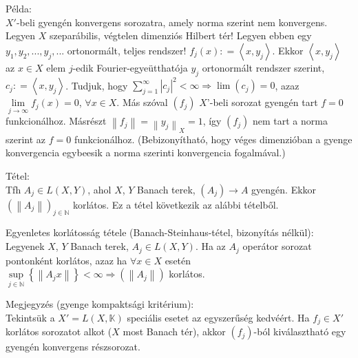 \documentclass[12pt,a4paper]{scrartcl}
\newenvironment{tetel}{}{}
\newenvironment{megjegyzes}{}{}
\newenvironment{pelda}{}{}
\begin{document}
\begin{pelda}

Példa:\\
\(X'\)-beli gyengén konvergens sorozatra, amely norma szerint nem
konvergens. Legyen \(X\) szeparábilis, végtelen dimenziós Hilbert tér!
Legyen ebben egy \(y_{1},y_{2},...,y_{j},...\) ortonormált, teljes
rendszer!
\(f_{j}\left( x \right): = \left\langle {x,y_{j}} \right\rangle\). Ekkor
\(\left\langle {x,y_{j}} \right\rangle\) az \(x \in X\) elem \(j\)-edik
Fourier-egyeütthatója \(y_{j}\) ortonormált rendszer szerint,
\(c_{j}: = \left\langle {x,y_{j}} \right\rangle\). Tudjuk, hogy
\(\left. {\sum\limits_{j = 1}^{\infty}\left| c_{j} \right|^{2}} < \infty\Rightarrow\lim\left( c_{j} \right) = 0 \right.\),
azaz \(\lim\limits_{j\rightarrow\infty}f_{j}\left( x \right) = 0\),
\(\forall x \in X\). Más szóval \(\left( f_{j} \right)\) \(X\)'-beli
sorozat gyengén tart \(f = 0\) funkcionálhoz. Másrészt
\(\left\| f_{j} \right\| = \left\| y_{j} \right\|_{X} = 1\), így
\(\left( f_{j} \right)\) nem tart a norma szerint az \(f = 0\)
funkcionálhoz. (Bebizonyítható, hogy véges dimenzióban a gyenge
konvergencia egybeesik a norma szerinti konvergencia fogalmával.)

\end{pelda}

\begin{tetel}

Tétel:\\
Tfh \(A_{j} \in L\left( {X,Y} \right)\), ahol \(X\), \(Y\) Banach terek,
\(\left. \left( A_{j} \right)\rightarrow A \right.\) gyengén. Ekkor
\(\left( \left\| A_{j} \right\| \right)_{j \in {\mathbb{N}}}\) korlátos.
Ez a tétel következik az alábbi tételből.

\end{tetel}

\begin{tetel}

Egyenletes korlátosság tétele (Banach-Steinhaus-tétel, bizonyítás
nélkül):\\
Legyenek \(X\), \(Y\) Banach terek, \(A_{j} \in L\left( {X,Y} \right)\).
Ha az \(A_{j}\) operátor sorozat pontonként korlátos, azaz ha
\(\forall x \in X\) esetén
\(\left. \sup\limits_{j \in {\mathbb{N}}}\left\{ \left\| {A_{j}x} \right\| \right\} < \infty\Rightarrow\left( \left\| A_{j} \right\| \right) \right.\)
korlátos.

\end{tetel}

\begin{megjegyzes}

Megjegyzés (gyenge kompaktsági kritérium):\\
Tekintsük a \(X' = L\left( {X,{\mathbb{K}}} \right)\) speciális esetet
az egyszerűség kedvéért. Ha \(f_{j} \in X'\) korlátos sorozatot alkot
(\(X\) most Banach tér), akkor \(\left( f_{j} \right)\)-ból
kiválasztható egy gyengén konvergens részsorozat.

\end{megjegyzes}
\end{document}
